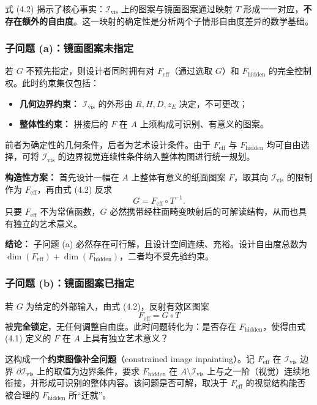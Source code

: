 \documentclass[12pt,a4paper]{ctexart}
\begin{document}
式 (4.2) 揭示了核心事实：$\mathcal{I}_{\mathrm{vis}}$ 上的图案与镜面图案通过映射 $T$ 形成一一对应，\textbf{不存在额外的自由度}。这一映射的确定性是分析两个子情形自由度差异的数学基础。

\subsubsection{子问题 (a)：镜面图案未指定}

若 $G$ 不预先指定，则设计者同时拥有对 $F_{\mathrm{eff}}$（通过选取 $G$）和 $F_{\mathrm{hidden}}$ 的完全控制权。此时约束集仅包括：
\begin{itemize}
    \item \textbf{几何边界约束：} $\mathcal{I}_{\mathrm{vis}}$ 的外形由 $R,H,D,z_E$ 决定，不可更改；
    \item \textbf{整体性约束：} 拼接后的 $F$ 在 $A$ 上须构成可识别、有意义的图案。
\end{itemize}
前者为确定性的几何条件，后者为艺术设计条件。由于 $F_{\mathrm{eff}}$ 与 $F_{\mathrm{hidden}}$ 均可自由选择，可将 $\mathcal{I}_{\mathrm{vis}}$ 的边界视觉连续性条件纳入整体构图进行统一规划。

\textbf{构造性方案：} 首先设计一幅在 $A$ 上整体有意义的纸面图案 $F$，取其向 $\mathcal{I}_{\mathrm{vis}}$ 的限制作为 $F_{\mathrm{eff}}$，再由式 (4.2) 反求
\[
G = F_{\mathrm{eff}}\circ T^{-1}.
\]
只要 $F_{\mathrm{eff}}$ 不为常值函数，$G$ 必然携带经柱面畸变映射后的可解读结构，从而也具有独立的艺术意义。

\textbf{结论：} 子问题 (a) 必然存在可行解，且设计空间连续、充裕。设计自由度总数为 $\dim(F_{\mathrm{eff}}) + \dim(F_{\mathrm{hidden}})$，二者均不受先验约束。

\subsubsection{子问题 (b)：镜面图案已指定}

若 $G$ 为给定的外部输入，由式 (4.2)，反射有效区图案
\[
F_{\mathrm{eff}} = G\circ T
\]
被\textbf{完全锁定}，无任何调整自由度。此时问题转化为：是否存在 $F_{\mathrm{hidden}}$，使得由式 (4.1) 定义的 $F$ 在 $A$ 上具有独立艺术意义？

这构成一个\textbf{约束图像补全问题}（constrained image inpainting）。记 $F_{\mathrm{eff}}$ 在 $\mathcal{I}_{\mathrm{vis}}$ 边界 $\partial\mathcal{I}_{\mathrm{vis}}$ 上的取值为边界条件，要求 $F_{\mathrm{hidden}}$ 在 $A\setminus\mathcal{I}_{\mathrm{vis}}$ 上与之一阶（视觉）连续地衔接，并形成可识别的整体内容。该问题是否可解，取决于 $F_{\mathrm{eff}}$ 的视觉结构能否被合理的 $F_{\mathrm{hidden}}$ 所``迁就''。
\end{document}
